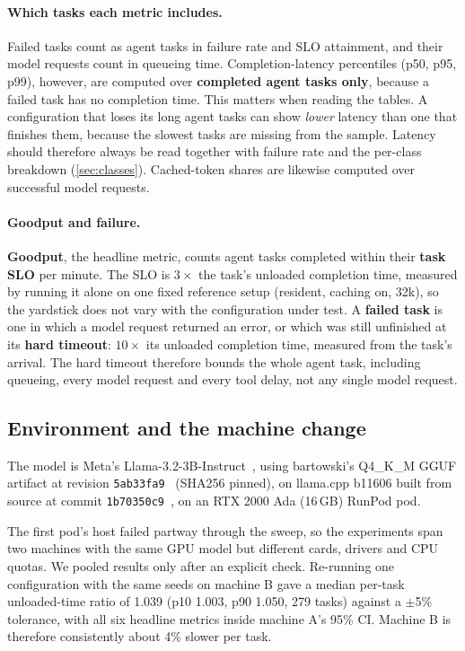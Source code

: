 \paragraph{Which tasks each metric includes.} Failed tasks count as agent tasks in failure rate and SLO attainment, and their model requests count in queueing time. Completion-latency percentiles (p50, p95, p99), however, are computed over \textbf{completed agent tasks only}, because a failed task has no completion time. This matters when reading the tables. A configuration that loses its long agent tasks can show \emph{lower} latency than one that finishes them, because the slowest tasks are missing from the sample. Latency should therefore always be read together with failure rate and the per-class breakdown (\cref{sec:classes}). Cached-token shares are likewise computed over successful model requests.

\paragraph{Goodput and failure.} \textbf{Goodput}, the headline metric, counts agent tasks completed within their \textbf{task SLO} per minute. The SLO is $3\times$ the task's unloaded completion time, measured by running it alone on one fixed reference setup (resident, caching on, 32k), so the yardstick does not vary with the configuration under test. A \textbf{failed task} is one in which a model request returned an error, or which was still unfinished at its \textbf{hard timeout}: $10\times$ its unloaded completion time, measured from the task's arrival. The hard timeout therefore bounds the whole agent task, including queueing, every model request and every tool delay, not any single model request.

\subsection{Environment and the machine change}\label{sec:environment}

The model is Meta's Llama-3.2-3B-Instruct~\cite{meta2024llama32}, using bartowski's Q4\_K\_M GGUF artifact at revision \texttt{5ab33fa9}~\cite{bartowski2024gguf} (SHA256 pinned), on llama.cpp b11606 built from source at commit \texttt{1b70350c9}~\cite{llamacpp}, on an RTX 2000 Ada (16\,GB) RunPod pod.

The first pod's host failed partway through the sweep, so the experiments span two machines with the same GPU model but different cards, drivers and CPU quotas. We pooled results only after an explicit check. Re-running one configuration with the same seeds on machine B gave a median per-task unloaded-time ratio of 1.039 (p10 1.003, p90 1.050, 279 tasks) against a $\pm$5\% tolerance, with all six headline metrics inside machine A's 95\% CI. Machine B is therefore consistently about 4\% slower per task.

